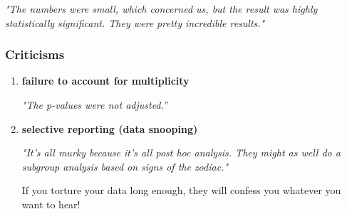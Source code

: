 \documentclass[xcolor={pdftex,dvipsnames,table}]{beamer}
\begin{document}
\begin{frame}
\bigskip

\emph{"The numbers were small, which concerned us, but the result was highly statistically significant. They were pretty incredible results."}

\end{frame}

\begin{frame}
\frametitle{Criticisms}

\begin{enumerate}
\item \textcolor{cambridgedarkorange}{\textbf{failure to account for multiplicity}}

\bigskip 

\emph{"The p-values were not adjusted.''}
% 
% 
% 


\bigskip 

\item \textcolor{cambridgedarkorange}{\textbf{selective reporting (data snooping)}}

\bigskip 

\emph{"It's all murky because it's all post hoc analysis. They might as well do a subgroup analysis based on signs of the zodiac."}

\bigskip

If you torture your data long enough, they will confess you whatever you want to hear!
\end{enumerate}

\end{frame}
\end{document}
